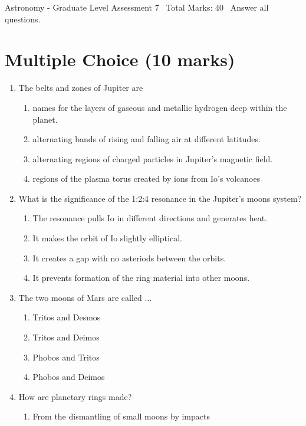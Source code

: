 \documentclass[12pt]{article}
\begin{document}
\begin{center}
Astronomy - Graduate Level Assessment 7 \
Total Marks: 40 \
Answer all questions.
\end{center}

\section*{Multiple Choice (10 marks)}
\begin{enumerate}[label=\arabic*.]
\item The belts and zones of Jupiter are
\begin{enumerate}[label=(\alph*)]
    \item names for the layers of gaseous and metallic hydrogen deep within the planet.
    \item alternating bands of rising and falling air at different latitudes.
    \item alternating regions of charged particles in Jupiter's magnetic field.
    \item regions of the plasma torus created by ions from Io's volcanoes
\end{enumerate}
\item What is the significance of the 1:2:4 resonance in the Jupiter's moons system?
\begin{enumerate}[label=(\alph*)]
    \item The resonance pulls Io in different directions and generates heat.
    \item It makes the orbit of Io slightly elliptical.
    \item It creates a gap with no asteriods between the orbits.
    \item It prevents formation of the ring material into other moons.
\end{enumerate}
\item The two moons of Mars are called ...
\begin{enumerate}[label=(\alph*)]
    \item Tritos and Desmos
    \item Tritos and Deimos
    \item Phobos and Tritos
    \item Phobos and Deimos
\end{enumerate}
\item How are planetary rings made?
\begin{enumerate}[label=(\alph*)]
    \item From the dismantling of small moons by impacts

\end{enumerate}
\end{enumerate}
\end{document}
